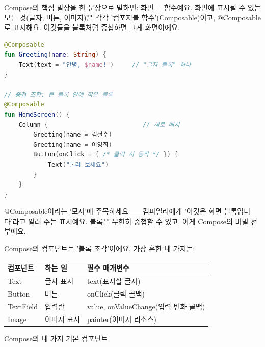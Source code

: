 


Compose의 핵심 발상을 한 문장으로 말하면: 화면 = 함수예요. 화면에 표시될 수 있는 모든 것(글자, 버튼, 이미지)은 각각 '컴포저블 함수'(Composable)이고, @Composable로 표시해요. 이것들을 블록처럼 중첩하면 그게 화면이에요.

\begin{lstlisting}[language=Kotlin]
@Composable
fun Greeting(name: String) {
    Text(text = "안녕, $name!")     // "글자 블록" 하나
}

// 중첩 조합: 큰 블록 안에 작은 블록
@Composable
fun HomeScreen() {
    Column {                          // 세로 배치
        Greeting(name = 김철수)
        Greeting(name = 이영희)
        Button(onClick = { /* 클릭 시 동작 */ }) {
            Text("눌러 보세요")
        }
    }
}
\end{lstlisting}

@Composable이라는 '모자'에 주목하세요——컴파일러에게 '이것은 화면 블록입니다'라고 알려 주는 표시예요. 블록은 무한히 중첩할 수 있고, 이게 Compose의 비밀 전부예요.


Compose의 컴포넌트는 '블록 조각'이에요. 가장 흔한 네 가지는:

\begin{center}
\begin{tabularx}{\linewidth}{|X|X|X|}
\hline
\textbf{컴포넌트} & \textbf{하는 일} & \textbf{필수 매개변수} \tabularnewline
\hline
Text & 글자 표시 & text(표시할 글자) \tabularnewline
Button & 버튼 & onClick(클릭 콜백) \tabularnewline
TextField & 입력란 & value, onValueChange(입력 변화 콜백) \tabularnewline
Image & 이미지 표시 & painter(이미지 리소스) \tabularnewline
\hline
\end{tabularx}
\end{center}

\begin{center}\small\color{gray}Compose의 네 가지 기본 컴포넌트\end{center}


